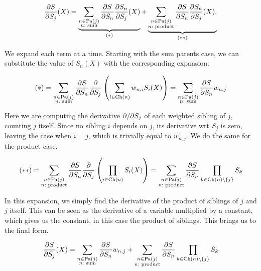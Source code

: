 \begin{equation*}
  \frac{\partial S}{\partial S_j}(X)=\underbrace{\sum_{\substack{n\in\operatorname*{\text{Pa}}(j)\\n:\text{
          sum}}}\frac{\partial S}{\partial S_n}\frac{\partial S_n}{\partial S_j}(X)}_{(\ast)}+
    \underbrace{\sum_{\substack{n\in\operatorname*{\text{Pa}}(j)\\n:\text{
            product}}}\frac{\partial S}{\partial S_n}\frac{\partial S_n}{\partial S_j}(X).}_{(\ast\ast)}
\end{equation*}

We expand each term at a time. Starting with the sum parents case, we can substitute the value of
$S_n(X)$ with the corresponding expansion.

\begin{equation*}
  (\ast)=\sum_{\substack{n\in\operatorname*{\text{Pa}}(j)\\n:\text{ sum}}}\frac{\partial S}{\partial S_n}\frac{\partial}{\partial S_j}\left(\sum_{i\in\operatorname*{\text{Ch}}(n)}
    w_{n,i}S_i(X)\right)=\sum_{\substack{n\in\operatorname*{\text{Pa}}(j)\\n:\text{ sum}}}\frac{\partial S}{\partial S_n}w_{n,j}
\end{equation*}

Here we are computing the derivative $\partial/\partial S_j$ of each weighted sibling of $j$, counting $j$
itself. Since no sibling $i$ depends on $j$, its derivative wrt $S_j$ is zero, leaving the case
when $i=j$, which is trivially equal to $w_{n,j}$. We do the same for the product case.

\begin{equation*}
  (\ast\ast)=\sum_{\substack{n\in\operatorname*{\text{Pa}}(j)\\n:\text{ product}}}\frac{\partial S}{\partial S_n}\frac{\partial}{\partial S_j}\left(\prod_{i\in\operatorname*{\text{Ch}}(n)}
    S_i(X)\right)=\sum_{\substack{n\in\operatorname*{\text{Pa}}(j)\\n:\text{ product}}}\frac{\partial S}{\partial S_n}\prod_{k\in
      \operatorname*{\text{Ch}}(n)\setminus\{j\}}S_k
\end{equation*}

In this expansion, we simply find the derivative of the product of siblings of $j$ and $j$ itself.
This can be seen as the derivative of a variable multiplied by a constant, which gives us the
constant, in this case the product of siblings. This brings us to the final form.

\begin{equation}
  \frac{\partial S}{\partial S_j}(X)=\sum_{\substack{n\in\operatorname*{\text{Pa}}(j)\\n:\text{
        sum}}}\frac{\partial S}{\partial S_n}w_{n,j}+\sum_{\substack{n\in\operatorname*{\text{Pa}}(j)\\n: \text{
        product}}}\frac{\partial S}{\partial S_n}\prod_{k\in\operatorname*{\text{Ch}}(n)\setminus\{j\}}S_k
\end{equation}

